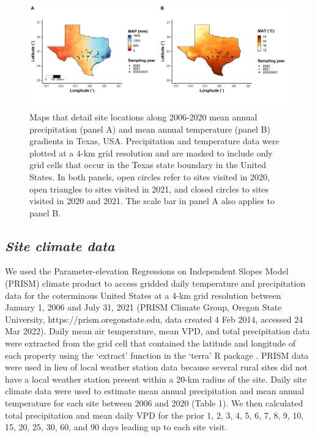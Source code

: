 \newpage
\begin{landscape}
    \begin{figure}
        \centering
        \includegraphics[scale = 0.049]{ch4_TXeco/figs/TXeco_fig1_site_map.png}
        \caption[Maps that detail site locations along 2006-2020 mean annual precipitation (panel A) and mean annual temperature (panel B) gradients in Texas, USA.]{Maps that detail site locations along 2006-2020 mean annual precipitation (panel A) and mean annual temperature (panel B) gradients in Texas, USA. Precipitation and temperature data were plotted at a 4-km grid resolution and are masked to include only grid cells that occur in the Texas state boundary in the United States. In both panels, open circles refer to sites visited in 2020, open triangles to sites visited in 2021, and closed circles to sites visited in 2020 and 2021. The scale bar in panel A also applies to panel B.}
        \label{fig:figure4.1}
    \end{figure}
\end{landscape}
\clearpage

\subsection{\textit{Site climate data}}
We used the Parameter-elevation Regressions on Independent Slopes Model (PRISM) climate product to access gridded daily temperature and precipitation data for the coterminous United States at a 4-km grid resolution between January 1, 2006 and July 31, 2021 (PRISM Climate Group, Oregon State University, https://prism.oregonstate.edu, data created 4 Feb 2014, accessed 24 Mar 2022). Daily mean air temperature, mean VPD, and total precipitation data were extracted from the grid cell that contained the latitude and longitude of each property using the ‘extract’ function in the ‘terra’ R package . PRISM data were used in lieu of local weather station data because several rural sites did not have a local weather station present within a 20-km radius of the site. Daily site climate data were used to estimate mean annual precipitation and mean annual temperature for each site between 2006 and 2020 (Table 1). We then calculated total precipitation and mean daily VPD for the prior 1, 2, 3, 4, 5, 6, 7, 8, 9, 10, 15, 20, 25, 30, 60, and 90 days leading up to each site visit.

